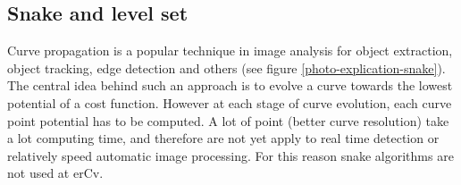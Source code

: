 \subsection{Snake and level set}
\label{snake-and-level-set}
 
Curve propagation is a popular technique in image analysis 
for object extraction, object tracking, edge detection and 
others (see figure \ref{photo-explication-snake}). The central
 idea behind such an approach is to evolve a curve towards 
the lowest potential of a cost function. However at each 
stage of curve evolution, each curve point potential has 
to be computed. A lot of point (better curve resolution) 
take a lot computing time, and therefore are not yet apply
 to real time detection or relatively speed automatic image
 processing. For this reason snake algorithms are not used at erCv.

